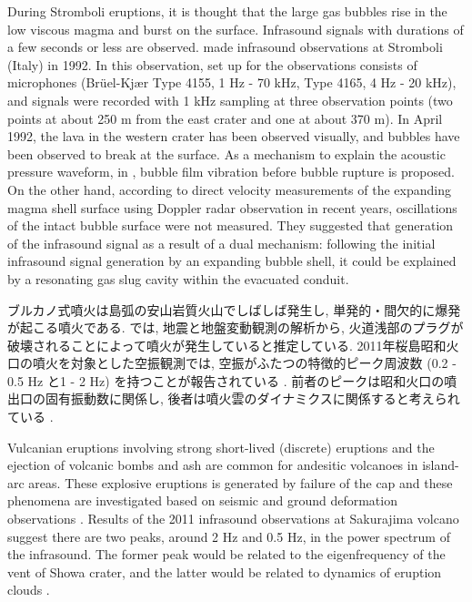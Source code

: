 \documentclass[12pt]{article}
\begin{document}
During Stromboli eruptions, it is thought that the large gas bubbles rise in the low viscous magma and burst on the surface. Infrasound signals with durations of a few seconds or less are observed.
\cite{Vergniolle1996b} made infrasound observations at Stromboli (Italy) in 1992. 
In this observation, set up for the observations consists of microphones (Br\"uel-Kj\ae r Type 4155, 1 Hz - 70 kHz, Type 4165, 4 Hz - 20 kHz), and signals were recorded with 1 kHz sampling at three observation points (two points at about 250 m from the east crater and one at about 370 m).
In April 1992, the lava in the western crater has been observed visually, and bubbles have been observed to break at the surface.
As a mechanism to explain the acoustic pressure waveform, in \cite{Vergniolle1996c}, bubble film vibration before bubble rupture is proposed.
On the other hand, according to direct velocity measurements of the expanding magma shell surface using Doppler radar observation in recent years, oscillations of the intact bubble surface were not measured.
They suggested that generation of the infrasound signal as a result of a dual mechanism: following the initial infrasound signal generation by an expanding bubble shell, it could be explained by a resonating gas slug cavity within the evacuated conduit.

ブルカノ式噴火は島弧の安山岩質火山でしばしば発生し, 単発的・間欠的に爆発が起こる噴火である. 
\cite{Iguchi2008}では, 地震と地盤変動観測の解析から, 火道浅部のプラグが破壊されることによって噴火が発生していると推定している.
2011年桜島昭和火口の噴火を対象とした空振観測では, 空振がふたつの特徴的ピーク周波数 (0.2 - 0.5 Hz と1 - 2 Hz) を持つことが報告されている \citep{yokoo2012bo}. 
前者のピークは昭和火口の噴出口の固有振動数に関係し, 後者は噴火雲のダイナミクスに関係すると考えられている \citep {yokoo2012bo}.

Vulcanian eruptions involving strong short-lived (discrete) eruptions and the ejection of volcanic bombs and ash are common for andesitic volcanoes in island-arc areas.
These explosive eruptions is generated by failure of the cap and these phenomena are investigated based on seismic and ground deformation observations \citep{Iguchi2008}.
Results of the 2011 infrasound observations at Sakurajima volcano suggest there are two peaks, around 2 Hz and 0.5 Hz, in the power spectrum of the infrasound. 
The former peak would be related to the eigenfrequency of the vent of Showa crater, and the latter would be related to dynamics of eruption clouds \citep{yokoo2012bo}. 
\end{document}
